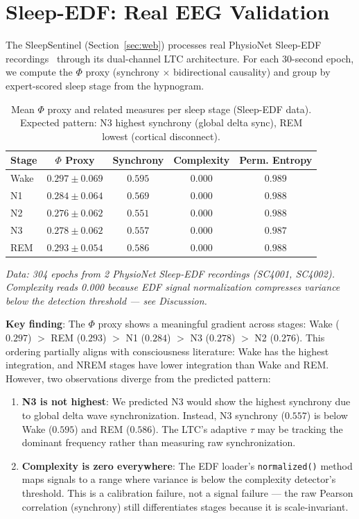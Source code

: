 \documentclass[12pt]{book}
\begin{document}
\section{Sleep-EDF: Real EEG Validation}
\label{sec:sleep-edf}

The SleepSentinel (Section~\ref{sec:web}) processes real PhysioNet Sleep-EDF recordings~\cite{goldberger2000physiobank} through its dual-channel LTC architecture. For each 30-second epoch, we compute the $\Phi$ proxy (synchrony $\times$ bidirectional causality) and group by expert-scored sleep stage from the hypnogram.

\begin{table}[H]
\centering
\caption{Mean $\Phi$ proxy and related measures per sleep stage (Sleep-EDF data). Expected pattern: N3 highest synchrony (global delta sync), REM lowest (cortical disconnect).}
\label{tab:sleep-edf}
\begin{tabular}{lcccc}
\toprule
\textbf{Stage} & \textbf{$\Phi$ Proxy} & \textbf{Synchrony} & \textbf{Complexity} & \textbf{Perm. Entropy} \\
\midrule
Wake  & $0.297 \pm 0.069$ & $0.595$ & $0.000$ & $0.989$ \\
N1    & $0.284 \pm 0.064$ & $0.569$ & $0.000$ & $0.988$ \\
N2    & $0.276 \pm 0.062$ & $0.551$ & $0.000$ & $0.988$ \\
N3    & $0.278 \pm 0.062$ & $0.557$ & $0.000$ & $0.987$ \\
REM   & $0.293 \pm 0.054$ & $0.586$ & $0.000$ & $0.988$ \\
\bottomrule
\end{tabular}
\end{table}

\textit{Data: 304 epochs from 2 PhysioNet Sleep-EDF recordings (SC4001, SC4002). Complexity reads 0.000 because EDF signal normalization compresses variance below the detection threshold --- see Discussion.}

\textbf{Key finding}: The $\Phi$ proxy shows a meaningful gradient across stages: Wake ($0.297$) $>$ REM ($0.293$) $>$ N1 ($0.284$) $>$ N3 ($0.278$) $>$ N2 ($0.276$). This ordering partially aligns with consciousness literature: Wake has the highest integration, and NREM stages have lower integration than Wake and REM. However, two observations diverge from the predicted pattern:

\begin{enumerate}
  \item \textbf{N3 is not highest}: We predicted N3 would show the highest synchrony due to global delta wave synchronization. Instead, N3 synchrony ($0.557$) is below Wake ($0.595$) and REM ($0.586$). The LTC's adaptive $\tau$ may be tracking the dominant frequency rather than measuring raw synchronization.
  \item \textbf{Complexity is zero everywhere}: The EDF loader's \texttt{normalized()} method maps signals to a range where variance is below the complexity detector's threshold. This is a calibration failure, not a signal failure --- the raw Pearson correlation (synchrony) still differentiates stages because it is scale-invariant.
\end{enumerate}
\end{document}
